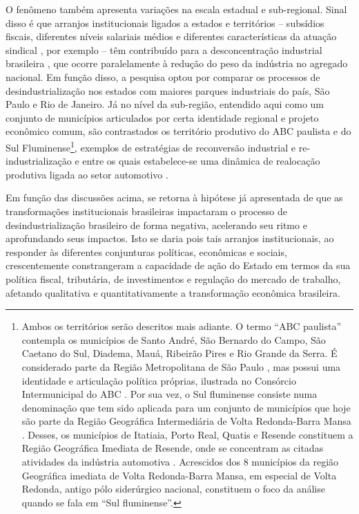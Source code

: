 O fenômeno também apresenta variações na escala estadual e sub-regional.
Sinal disso é que arranjos institucionais ligados a estados e
territórios -- subsídios fiscais, diferentes níveis salariais médios e
diferentes características da atuação sindical
\citep{ramalho2004,ramalho2015}, por exemplo -- têm contribuído para a desconcentração industrial
brasileira \citep{cni2021}, que ocorre paralelamente à redução do peso da indústria no
agregado nacional. Em função disso, a pesquisa optou por comparar os
processos de desindustrialização nos estados com maiores parques
industriais do país, São Paulo e Rio de Janeiro. Já no nível da
sub-região, entendido aqui como um conjunto de municípios articulados
por certa identidade regional e projeto econômico comum, são
contrastados os território produtivo do ABC paulista e do Sul
Fluminense\footnote{Ambos os territórios serão descritos mais adiante. O
  termo ``ABC paulista'' contempla os municípios de Santo André, São
  Bernardo do Campo, São Caetano do Sul, Diadema, Mauá, Ribeirão Pires e
  Rio Grande da Serra. É considerado parte da Região Metropolitana de
  São Paulo \citep{governoestadosp_sd}, mas possui uma identidade e
  articulação política próprias, ilustrada no Consórcio Intermunicipal
  do ABC \citep{consorcioabc_sd}. Por sua vez, o Sul fluminense consiste numa
  denominação que tem sido aplicada para um conjunto de municípios que
  hoje são parte da Região Geográfica Intermediária de Volta
  Redonda-Barra Mansa
  \citep{ibge2017}.
  Desses, os municípios de Itatiaia, Porto Real, Quatis e Resende
  constituem a Região Geográfica Imediata de Resende, onde se concentram
  as citadas atividades da indústria automotiva
  \citep{ramalhosantos2022}. Acrescidos dos 8 municípios da região Geográfica imediata de
  Volta Redonda-Barra Mansa, em especial de Volta Redonda, antigo pólo
  siderúrgico nacional, constituem o foco da análise quando se fala em
  ``Sul fluminense''.}, exemplos de estratégias de reconversão
industrial e re-industrialização e entre os quais estabelece-se uma
dinâmica de realocação produtiva ligada ao setor automotivo
\citep{rodriguesramalho2007}.

Em função das discussões acima, se retorna à hipótese já apresentada de
que as transformações institucionais brasileiras impactaram o processo
de desindustrialização brasileiro de forma negativa, acelerando seu
ritmo e aprofundando seus impactos. Isto se daria pois tais arranjos
institucionais, ao responder às diferentes conjunturas políticas,
econômicas e sociais, crescentemente constrangeram a capacidade de ação
do Estado em termos da sua política fiscal, tributária, de investimentos
e regulação do mercado de trabalho, afetando qualitativa e
quantitativamente a transformação econômica brasileira.

